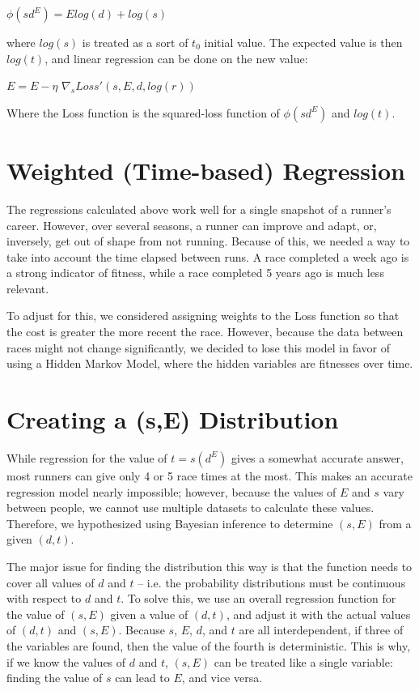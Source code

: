 \documentclass{article}
\begin{document}
	$\phi(sd^E) = Elog(d)+log(s)$
	
where $log(s)$ is treated as a sort of $t_0$ initial value. The expected value is then $log(t)$, and linear regression can be done on the new value: 

	$E = E - \eta$ $\nabla_s Loss'(s,E,d,log(r))$
	
	Where the Loss function is the squared-loss function of $\phi(sd^E)$ and $log(t)$. 

\section{Weighted (Time-based) Regression}

	The regressions calculated above work well for a single snapshot of a runner's career. However, over several seasons, a runner can improve and adapt, or, inversely, get out of shape from not running. Because of this, we needed a way to take into account the time elapsed between runs. A race completed a week ago is a strong indicator of fitness, while a race completed 5 years ago is much less relevant. 
	
	To adjust for this, we considered assigning weights to the Loss function so that the cost is greater the more recent the race. However, because the data between races might not change significantly, we decided to lose this model in favor of using a Hidden Markov Model, where the hidden variables are fitnesses over time.
	

\section{Creating a (s,E) Distribution}

	While regression for the value of $t=s(d^E)$ gives a somewhat accurate answer, most runners can give only 4 or 5 race times at the most. This makes an accurate regression model nearly impossible; however, because the values of $E$ and $s$ vary between people, we cannot use multiple datasets to calculate these values. Therefore, we hypothesized using Bayesian inference to determine $(s,E)$ from a given $(d,t)$. 
	
	The major issue for finding the distribution this way is that the function needs to cover all values of $d$ and $t$ -- i.e. the probability distributions must be continuous with respect to $d$ and $t$. To solve this, we use an overall regression function for the value of $(s,E)$ given a value of $(d,t)$, and adjust it with the actual values of $(d,t)$ and $(s,E)$. Because $s$, $E$, $d$, and $t$ are all interdependent, if three of the variables are found, then the value of the fourth is deterministic. This is why, if we know the values of $d$ and $t$, $(s,E)$ can be treated like a single variable: finding the value of $s$ can lead to $E$, and vice versa.
	
\end{document}
